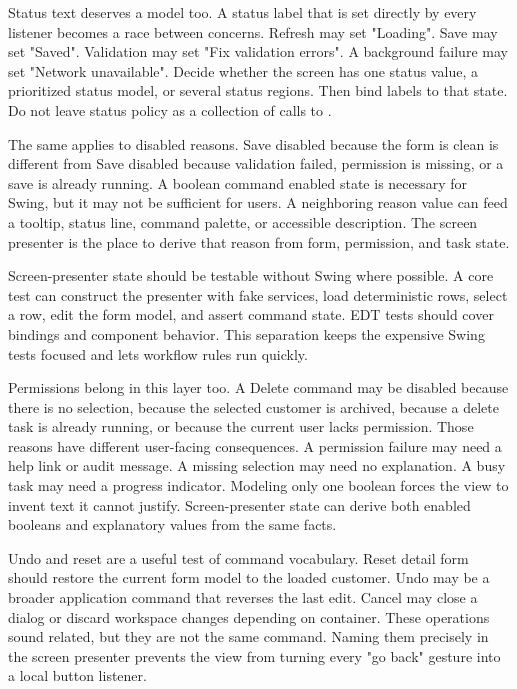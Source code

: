 Status text deserves a model too. A status label that is set directly by every
listener becomes a race between concerns. Refresh may set "Loading". Save may
set "Saved". Validation may set "Fix validation errors". A background failure
may set "Network unavailable". Decide whether the screen has one status value,
a prioritized status model, or several status regions. Then bind labels to
that state. Do not leave status policy as a collection of calls to
.

The same applies to disabled reasons. Save disabled because the form is clean
is different from Save disabled because validation failed, permission is
missing, or a save is already running. A boolean command enabled state is
necessary for Swing, but it may not be sufficient for users. A neighboring
reason value can feed a tooltip, status line, command palette, or accessible
description. The screen presenter is the place to derive that reason from form,
permission, and task state.

Screen-presenter state should be testable without Swing where possible. A core test
can construct the presenter with fake services, load deterministic rows,
select a row, edit the form model, and assert command state. EDT tests should
cover bindings and component behavior. This separation keeps the expensive
Swing tests focused and lets workflow rules run quickly.

Permissions belong in this layer too. A Delete command may be disabled because
there is no selection, because the selected customer is archived, because a
delete task is already running, or because the current user lacks permission.
Those reasons have different user-facing consequences. A permission failure
may need a help link or audit message. A missing selection may need no
explanation. A busy task may need a progress indicator. Modeling only one
boolean forces the view to invent text it cannot justify. Screen-presenter state can
derive both enabled booleans and explanatory values from the same facts.

Undo and reset are a useful test of command vocabulary. Reset detail form
should restore the current form model to the loaded customer. Undo may be a
broader application command that reverses the last edit. Cancel may close a
dialog or discard workspace changes depending on container. These operations
sound related, but they are not the same command. Naming them precisely in the
screen presenter prevents the view from turning every "go back" gesture into a local
button listener.

